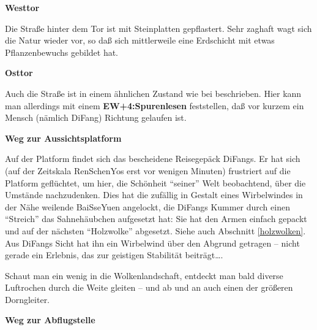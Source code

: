 \documentclass[
a4paper,
twoside,
DIV=calc,
BCOR=4mm,
fontsize=9pt,
twocolumn=on,
titlepage=on,
parskip=half
]{scrartcl}
\begin{document}
\textbf{ Westtor}


Die Straße hinter dem Tor ist mit Steinplatten gepflastert. Sehr
zaghaft wagt sich die Natur wieder vor, so daß sich mittlerweile eine
Erdschicht mit etwas Pflanzenbewuchs gebildet hat.

\textbf{ Osttor}


Auch die Straße ist in einem ähnlichen Zustand wie bei 
beschrieben. Hier kann man allerdings mit einem
\textbf{EW+4:Spurenlesen} feststellen, daß vor kurzem ein Mensch
(nämlich DiFang) Richtung  gelaufen ist.

\textbf{ Weg zur Aussichtsplatform}


Auf der Platform findet sich das bescheidene Reisegepäck DiFangs. Er
hat sich (auf der Zeitskala RenSchenYos erst vor wenigen Minuten)
frustriert auf die Platform geflüchtet, um hier, die Schönheit
"`seiner"' Welt beobachtend, über die Umstände nachzudenken. Dies hat
die zufällig in Gestalt eines Wirbelwindes in der Nähe weilende
BaiSseYuen angelockt, die DiFangs Kummer durch einen "`Streich"' das
Sahnehäubchen aufgesetzt hat: Sie hat den Armen einfach gepackt und
auf der nächsten "`Holzwolke"' abgesetzt. Siehe auch Abschnitt
\ref{holzwolken}. Aus DiFangs Sicht hat ihn ein Wirbelwind über den
Abgrund getragen -- nicht gerade ein Erlebnis, das zur geistigen
Stabilität beiträgt\dots.

Schaut man ein wenig in die Wolkenlandschaft, entdeckt man bald
diverse Luftrochen durch die Weite gleiten -- und ab und an auch einen
der größeren Dorngleiter.

\textbf{ Weg zur Abflugstelle}
\end{document}
